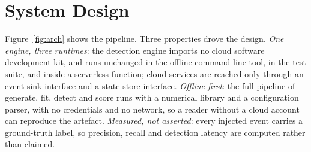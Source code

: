 \documentclass[10pt,journal]{IEEEtran}
\begin{document}
\section{System Design}
\label{sec:design}

Figure~\ref{fig:arch} shows the pipeline. Three properties drove the design.
\emph{One engine, three runtimes}: the detection engine imports no cloud
software development kit, and runs unchanged in the offline command-line tool,
in the test suite, and inside a serverless function; cloud services are reached
only through an event sink interface and a state-store interface.
\emph{Offline first}: the full pipeline of generate, fit, detect and score
runs with a numerical library and a configuration parser, with no credentials
and no network, so a reader without a cloud account can reproduce the
artefact. \emph{Measured, not asserted}: every injected event
carries a ground-truth label, so precision, recall and detection latency are
computed rather than claimed.
\end{document}
